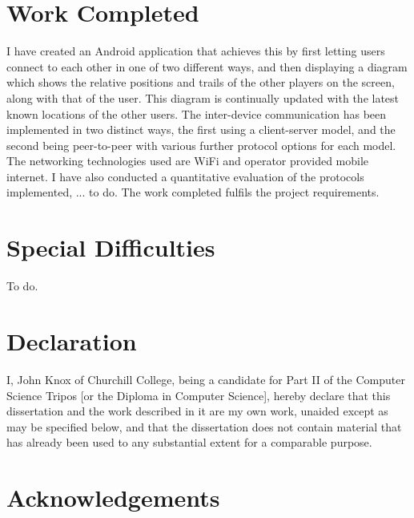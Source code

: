 \section*{Work Completed}

I have created an Android application that achieves this by first letting users connect to each other in one of two different ways, and then displaying a diagram which shows the relative positions and trails of the other players on the screen, along with that of the user. This diagram is continually updated with the latest known locations of the other users. The inter-device communication has been implemented in two distinct ways, the first using a client-server model, and the second being peer-to-peer with various further protocol options for each model.
The networking technologies used are WiFi and operator provided mobile internet.
I have also conducted a quantitative evaluation of the protocols implemented, ... to do.
The work completed fulfils the project requirements.

\section*{Special Difficulties}

To do.
 
\newpage
\section*{Declaration}

I, John Knox of Churchill College, being a candidate for Part II of the Computer
Science Tripos [or the Diploma in Computer Science], hereby declare
that this dissertation and the work described in it are my own work,
unaided except as may be specified below, and that the dissertation
does not contain material that has already been used to any substantial
extent for a comparable purpose.

\bigskip
{}

\medskip
{}

\cleardoublepage

\tableofcontents


\newpage
\section*{Acknowledgements}

